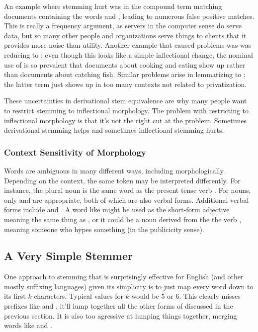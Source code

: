 An example where stemming hurt was in the compound term
 matching documents containing
the words  and , leading to
numerous false positive matches.  This is really a frequency argument,
as servers in the computer sense do serve data, but so many other
people and organizations serve things to clients that it provides more
noise than utility. Another example that caused problems was
was reducing  to ;
even though this looks like a simple inflectional change, the
nominal use of  is so prevalent that 
documents about cooking and eating show up rather than documents
about catching fish.  Similar problems arise in lemmatizing
 to ; the latter
term just shows up in too many contexts not related to privatization.

These uncertainties in derivational stem equivalence are why many
people want to restrict stemming to inflectional morphology. The
problem with restricting to inflectional morphology is that it's not
the right cut at the problem. Sometimes derivational stemming helps
and sometimes inflectional stemming hurts.%

\subsubsection{Context Sensitivity of Morphology}

Words are ambiguous in many different ways, including morphologically.
Depending on the context, the same token may be interpreted
differently.  For instance, the plural noun  is
the same word as the present tense verb .  For
nouns, only  and  are
appropriate, both of which are also verbal forms.  Additional verbal
forms include  and .  A word
like  might be used as the short-form adjective
meaning the same thing as , or it could be
a noun derived from the the verb , meaning someone
who hypes something (in the publicicity sense).


\subsection{A Very Simple Stemmer}\label{section:tok-simple-stemmer}

One approach to stemming that is surprisingly effective for English
(and other mostly suffixing languages) given its simplicity is to just
map every word down to its first $k$ characters.  Typical values for
$k$ would be 5 or 6.  This clearly misses prefixes like
 and , it'll lump together all
the other forms of  discussed in the previous
section.  It is also too agressive at lumping things together, merging
words like  and .

